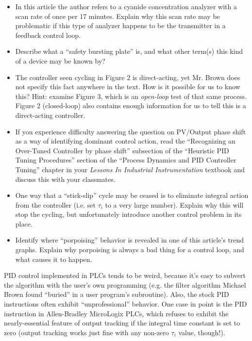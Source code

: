 \begin{itemize}
\item{} In this article the author refers to a cyanide concentration analyzer with a scan rate of once per 17 minutes.  Explain why this scan rate may be problematic if this type of analyzer happens to be the transmitter in a feedback control loop.
\item{} Describe what a ``safety bursting plate'' is, and what other term(s) this kind of a device may be known by?
\item{} The controller seen cycling in Figure 2 is direct-acting, yet Mr. Brown does not specify this fact anywhere in the text.  How is it possible for us to know this?  Hint: examine Figure 3, which is an {\it open-loop} test of that same process.  Figure 2 (closed-loop) also contains enough information for us to tell this is a direct-acting controller.
\item{} If you experience difficulty answering the question on PV/Output phase shift as a way of identifying dominant control action, read the ``Recognizing an Over-Tuned Controller by phase shift'' subsection of the ``Heuristic PID Tuning Procedures'' section of the ``Process Dynamics and PID Controller Tuning'' chapter in your {\it Lessons In Industrial Instrumentation} textbook and discuss this with your classmates.
\item{} One way that a ``stick-slip'' cycle may be ceased is to eliminate integral action from the controller (i.e. set $\tau_i$ to a very large number).  Explain why this will stop the cycling, but unfortunately introduce another control problem in its place.
\item{} Identify where ``porpoising'' behavior is revealed in one of this article's trend graphs.  Explain why porpoising is always a bad thing for a control loop, and what causes it to happen.
\end{itemize}














PID control implemented in PLCs tends to be weird, because it's easy to subvert the algorithm with the user's own programming (e.g. the filter algorithm Michael Brown found ``buried'' in a user program's subroutine).  Also, the stock PID instructions often exhibit ``unprofessional'' behavior.  One case in point is the PID instruction in Allen-Bradley MicroLogix PLCs, which refuses to exhibit the nearly-essential feature of output tracking if the integral time constant is set to zero (output tracking works just fine with any non-zero $\tau_i$ value, though!).

